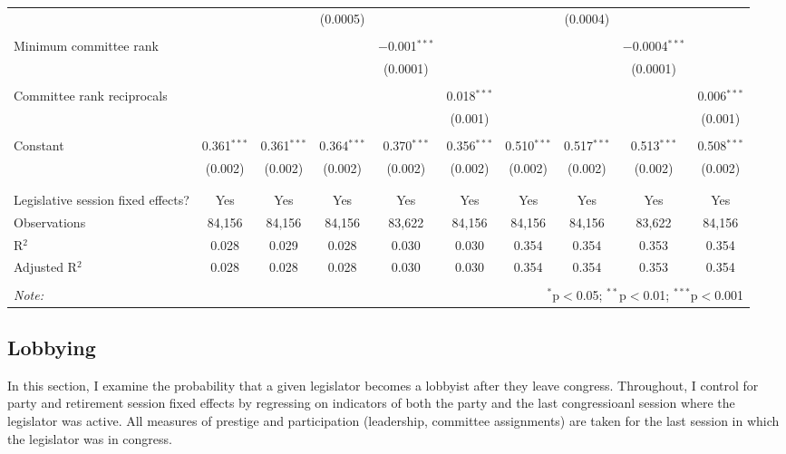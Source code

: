 \documentclass{article}
\begin{document}
\begin{sidewaystable}[!htbp]
{{\begin{tabular}{@{\extracolsep{5pt}}lccccccccc}
          &  &  & (0.0005) &  &  &  & (0.0004) &  &  \\ 
          & & & & & & & & & \\ 
         Minimum committee rank &  &  &  & $-$0.001$^{***}$ &  &  &  & $-$0.0004$^{***}$ &  \\ 
          &  &  &  & (0.0001) &  &  &  & (0.0001) &  \\ 
          & & & & & & & & & \\ 
         Committee rank reciprocals &  &  &  &  & 0.018$^{***}$ &  &  &  & 0.006$^{***}$ \\ 
          &  &  &  &  & (0.001) &  &  &  & (0.001) \\ 
          & & & & & & & & & \\ 
         Constant & 0.361$^{***}$ & 0.361$^{***}$ & 0.364$^{***}$ & 0.370$^{***}$ & 0.356$^{***}$ & 0.510$^{***}$ & 0.517$^{***}$ & 0.513$^{***}$ & 0.508$^{***}$ \\ 
          & (0.002) & (0.002) & (0.002) & (0.002) & (0.002) & (0.002) & (0.002) & (0.002) & (0.002) \\ 
          & & & & & & & & & \\ 
        \hline \\[-1.8ex] 
        Legislative session fixed effects? & Yes & Yes & Yes & Yes & Yes & Yes & Yes & Yes & Yes \\ 
        Observations & 84,156 & 84,156 & 84,156 & 83,622 & 84,156 & 84,156 & 84,156 & 83,622 & 84,156 \\ 
        R$^{2}$ & 0.028 & 0.029 & 0.028 & 0.030 & 0.030 & 0.354 & 0.354 & 0.353 & 0.354 \\ 
        Adjusted R$^{2}$ & 0.028 & 0.028 & 0.028 & 0.030 & 0.030 & 0.354 & 0.354 & 0.353 & 0.354 \\ 
        \hline 
        \hline \\[-1.8ex] 
        \textit{Note:}  & \multicolumn{9}{r}{$^{*}$p$<$0.05; $^{**}$p$<$0.01; $^{***}$p$<$0.001} \\ 
        \end{tabular} 
    }}
  \end{sidewaystable} 


  \subsection{Lobbying} 
  In this section, I examine the probability that a given legislator becomes a lobbyist after they leave congress. Throughout, I control for party and retirement session fixed effects by regressing on indicators of both the party and the last congressioanl session where the legislator was active. All measures of prestige and participation (leadership, committee assignments) are taken for the last session in which the legislator was in congress.
\end{document}
